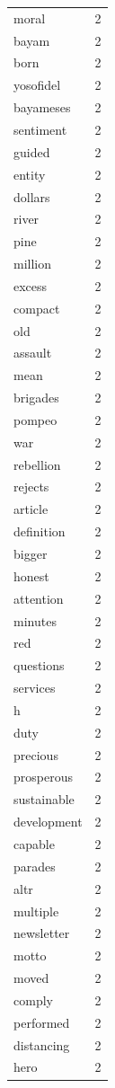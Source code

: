 \begin{tabular}{lr}
moral & 2 \\
bayam & 2 \\
born & 2 \\
yosofidel & 2 \\
bayameses & 2 \\
sentiment & 2 \\
guided & 2 \\
entity & 2 \\
dollars & 2 \\
river & 2 \\
pine & 2 \\
million & 2 \\
excess & 2 \\
compact & 2 \\
old & 2 \\
assault & 2 \\
mean & 2 \\
brigades & 2 \\
pompeo & 2 \\
war & 2 \\
rebellion & 2 \\
rejects & 2 \\
article & 2 \\
definition & 2 \\
bigger & 2 \\
honest & 2 \\
attention & 2 \\
minutes & 2 \\
red & 2 \\
questions & 2 \\
services & 2 \\
h & 2 \\
duty & 2 \\
precious & 2 \\
prosperous & 2 \\
sustainable & 2 \\
development & 2 \\
capable & 2 \\
parades & 2 \\
altr & 2 \\
multiple & 2 \\
newsletter & 2 \\
motto & 2 \\
moved & 2 \\
comply & 2 \\
performed & 2 \\
distancing & 2 \\
hero & 2 \\

\end{tabular}
